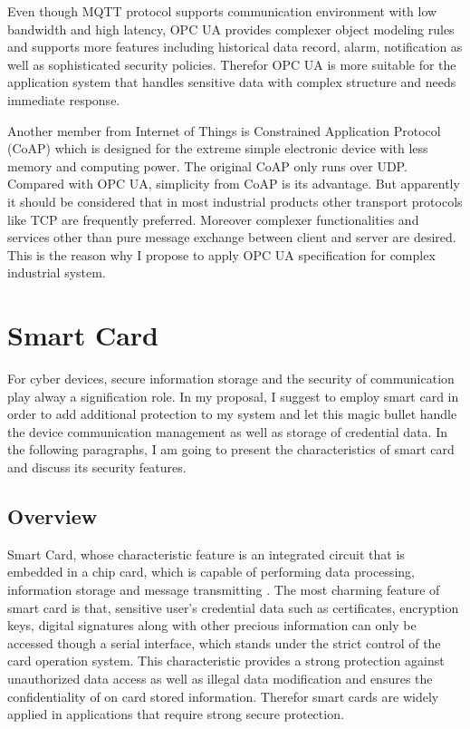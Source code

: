 Even though MQTT protocol supports communication environment with low bandwidth and high latency, OPC UA provides complexer object modeling rules and supports more features including historical data record, alarm, notification as well as sophisticated security policies. Therefor OPC UA is more suitable for the application system that handles sensitive data with complex structure and needs immediate response.


Another member from Internet of Things is Constrained Application Protocol (CoAP) \cite{Ref5} which is designed for the extreme simple electronic device with less memory and computing power. The original CoAP only runs over UDP. Compared with OPC UA, simplicity from CoAP is its advantage. But apparently it should be considered that in most industrial products other transport protocols like TCP are frequently preferred. Moreover complexer functionalities and services other than pure message exchange between client and server are desired. This is the reason why I propose to apply OPC UA specification for complex industrial system.

\section{Smart Card} \label{secSmartCard}
For cyber devices, secure information storage and the security of communication play alway a signification role. In my proposal, I suggest to employ smart card in order to add additional protection to my system and let this magic bullet handle the device communication management as well as storage of credential data. In the following paragraphs, I am going to present the characteristics of smart card and discuss its security features.
\subsection{Overview}
Smart Card, whose characteristic feature is an integrated circuit that is embedded in a chip card, which is capable of performing data processing, information storage and message transmitting \cite{handbuch}. The most charming feature of smart card is that, sensitive user's credential data such as certificates, encryption keys, digital signatures along with other precious information can only be accessed though a serial interface, which stands under the strict control of the card operation system. This characteristic provides a strong protection against  unauthorized data access as well as illegal data modification and ensures the confidentiality of on card stored information. Therefor smart cards are widely applied in applications that require strong secure protection.

